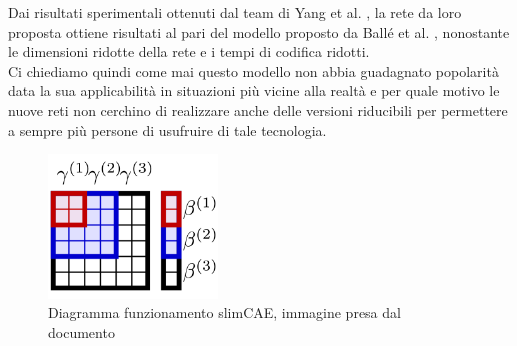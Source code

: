 Dai risultati sperimentali ottenuti dal team di Yang et al. \cite{yang2021slimmable}, la rete da loro proposta ottiene risultati al pari del modello proposto da Ballé et al. \cite{minnen2018joint}, nonostante le dimensioni ridotte della rete e i tempi di codifica ridotti.\\
Ci chiediamo quindi come mai questo modello non abbia guadagnato popolarità data la sua applicabilità in situazioni più vicine alla realtà e per quale motivo le nuove reti non cerchino di realizzare anche delle versioni riducibili per permettere a sempre più persone di usufruire di tale tecnologia.\\
\begin{figure}[!h]
    \centering
    \includegraphics[width=0.4\textwidth]{Immagini/slimCAE.png}
    \caption{Diagramma funzionamento slimCAE, immagine presa dal documento \cite{yang2021slimmable}}
    \label{fig:smallCAE}
\end{figure}
